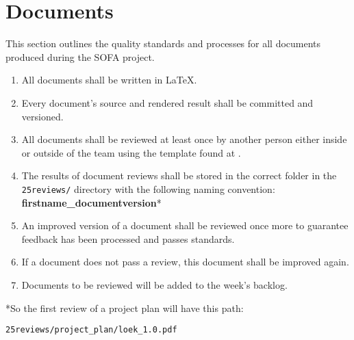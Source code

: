 \section{Documents}
This section outlines the quality standards and processes for all documents produced during the SOFA project.

\begin{enumerate}
	\item All documents shall be written in LaTeX.
	\item Every document's source and rendered result shall be committed and versioned.
	\item All documents shall be reviewed at least once by another person either inside or outside of the team using the template found at .
	\item The results of document reviews shall be stored in the correct folder in the \texttt{25reviews/} directory with the following naming convention:\\
	\textbf{firstname\_documentversion}*
	\item An improved version of a document shall be reviewed once more to guarantee feedback has been processed and passes standards.
	\item If a document does not pass a review, this document shall be improved again.
	\item Documents to be reviewed will be added to the week's backlog.
\end{enumerate}

*So the first review of a project plan will have this path:

\texttt{25reviews/project\_plan/loek\_1.0.pdf}